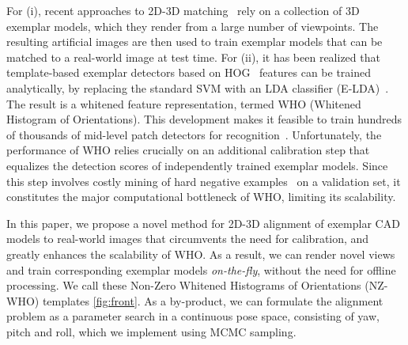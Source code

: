 For (i), recent approaches to 2D-3D matching~\cite{Aubry14, Lim14} rely on a
collection of 3D exemplar models, which they render from a
large number of viewpoints. The resulting artificial images are then
used to train exemplar models that can be matched to a real-world
image at test time.
%
For (ii), it has been realized that template-based exemplar detectors
based on HOG~\cite{Dalal05} features can be trained analytically, by
replacing the standard SVM with an LDA classifier
(E-LDA)~\cite{Hariharan12}. The result is a whitened feature
representation, termed WHO (Whitened Histogram of Orientations). This
development makes it feasible to train hundreds of thousands of mid-level patch
detectors for recognition~\cite{Aubry14}.
%
Unfortunately, the performance of WHO relies crucially on an
additional calibration step that equalizes the detection scores of
independently trained exemplar models. Since this step involves costly
mining of hard negative examples~\cite{Dalal05,Felzenszwalb10} on a
validation set, it constitutes the major computational bottleneck of
WHO, limiting its scalability.

In this paper, we propose a novel method for 2D-3D alignment of
exemplar CAD models to real-world images that circumvents the need for
calibration, and greatly enhances the scalability of WHO. As a
result, we can render novel views and train corresponding exemplar
models {\em on-the-fly}, without the need for offline processing. We call these Non-Zero Whitened Histograms of Orientations (NZ-WHO) templates \ref{fig:front}. As a
by-product, we can formulate the alignment problem as a parameter
search in a continuous pose space, consisting of yaw, pitch and roll, which
we implement using MCMC sampling. 

%

